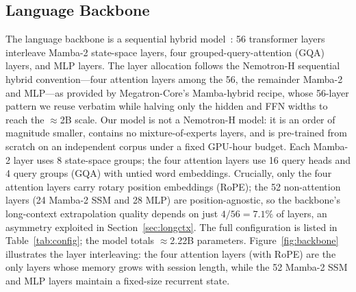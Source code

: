 \subsection{Language Backbone}\label{sec:arch}
The language backbone is a sequential hybrid model~\cite{dao2024transformers,nvidia2025nemotronh}: 56 transformer layers interleave Mamba-2 state-space layers, four grouped-query-attention (GQA) layers, and MLP layers.
The layer allocation follows the Nemotron-H sequential hybrid convention---four attention layers among the 56, the remainder Mamba-2 and MLP---as provided by Megatron-Core's Mamba-hybrid recipe, whose 56-layer pattern we reuse verbatim while halving only the hidden and FFN widths to reach the $\approx$2B scale.
Our model is not a Nemotron-H model: it is an order of magnitude smaller, contains no mixture-of-experts layers, and is pre-trained from scratch on an independent corpus under a fixed GPU-hour budget.
Each Mamba-2 layer uses 8 state-space groups; the four attention layers use 16 query heads and 4 query groups (GQA) with untied word embeddings.
Crucially, only the four attention layers carry rotary position embeddings (RoPE); the 52 non-attention layers (24 Mamba-2 SSM and 28 MLP) are position-agnostic, so the backbone's long-context extrapolation quality depends on just $4/56{=}7.1\%$ of layers, an asymmetry exploited in Section~\ref{sec:longctx}.
The full configuration is listed in Table~\ref{tab:config}; the model totals $\approx$2.22B parameters.
Figure~\ref{fig:backbone} illustrates the layer interleaving: the four attention layers (with RoPE) are the only layers whose memory grows with session length, while the 52 Mamba-2 SSM and MLP layers maintain a fixed-size recurrent state.

